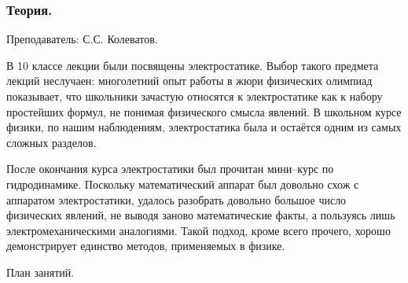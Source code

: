 \documentclass[12pt,a4paper,oneside]{scrartcl}
\begin{document}
\subsubsection{Теория.}
\label{sec:daily_10_th}

\textsf{Преподаватель: С.С. Колеватов.}

В 10 классе лекции были посвящены электростатике. Выбор такого
предмета лекций неслучаен: многолетний опыт работы в жюри физических
олимпиад показывает, что школьники зачастую относятся к электростатике
как к набору простейших формул, не понимая физического смысла
явлений. В школьном курсе физики, по нашим наблюдениям, электростатика
была и остаётся одним из самых сложных разделов.

После окончания курса электростатики был прочитан мини–курс по
гидродинамике. Поскольку математический аппарат был довольно схож с
аппаратом электростатики, удалось разобрать довольно большое число
физических явлений, не выводя заново математические факты, а пользуясь
лишь электромеханическими аналогиями. Такой подход, кроме всего
прочего, хорошо демонстрирует единство методов, применяемых в физике. 

\begin{center}
  \textsf{План занятий.}
\end{center}
\end{document}
